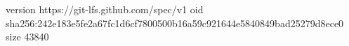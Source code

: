 version https://git-lfs.github.com/spec/v1
oid sha256:242e183e5fe2a67fc1d6cf7800500b16a59c921644e5840849bad25279d8ece0
size 43840

